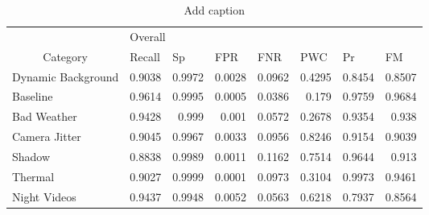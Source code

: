 \documentclass{article}
\begin{document}
\begin{table}[htbp]
  \centering
  \caption{Add caption}
    \begin{tabular}{lrrrrrrr}  
    \toprule
       & \multicolumn{7}{l}{Overall} \\ 
       \cmidrule{2-8} 
   \multicolumn{1}{c}{Category} & \multicolumn{1}{l}{Recall} & \multicolumn{1}{l}{Sp} & \multicolumn{1}{l}{FPR} & \multicolumn{1}{l}{FNR} & \multicolumn{1}{l}{PWC} & \multicolumn{1}{l}{Pr} & \multicolumn{1}{l}{FM} \\
    \midrule
    Dynamic Background & 0.9038 & 0.9972 & 0.0028 & 0.0962 & 0.4295 & 0.8454 & 0.8507 \\
    Baseline & 0.9614 & 0.9995 & 0.0005 & 0.0386 & 0.179 & 0.9759 & 0.9684 \\
    Bad Weather & 0.9428 & 0.999 & 0.001 & 0.0572 & 0.2678 & 0.9354 & 0.938 \\
    Camera Jitter & 0.9045 & 0.9967 & 0.0033 & 0.0956 & 0.8246 & 0.9154 & 0.9039 \\
    Shadow & 0.8838 & 0.9989 & 0.0011 & 0.1162 & 0.7514 & 0.9644 & 0.913 \\
    Thermal & 0.9027 & 0.9999 & 0.0001 & 0.0973 & 0.3104 & 0.9973 & 0.9461 \\
    Night Videos & 0.9437 & 0.9948 & 0.0052 & 0.0563 & 0.6218 & 0.7937 & 0.8564 \\
    \bottomrule
    \end{tabular}%
  \label{tab:addlabel}%
\end{table}%
\end{document}
